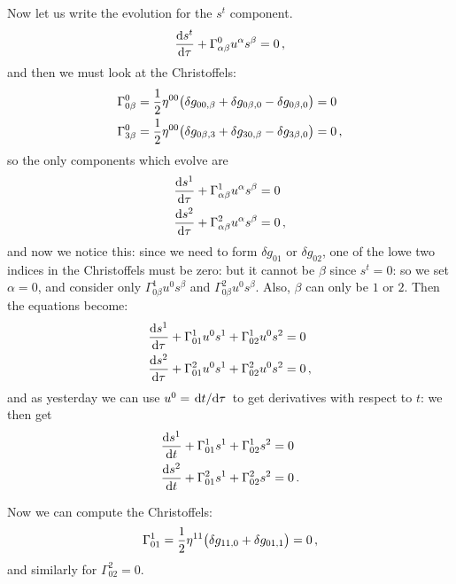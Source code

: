 \documentclass[main.tex]{subfiles}
\begin{document}
Now let us write the evolution for the \(s^{t}\) component. 
%
\begin{align}
  \dv{s^{t}}{\tau } + \Gamma^{0}_{\alpha \beta } u^{\alpha } s^{\beta } = 0
\,,
\end{align}
%
and then we must look at the Christoffels: 
%
\begin{align}
\Gamma^{0}_{0 \beta } &= \frac{1}{2} \eta^{00} \qty(
    \delta g_{0 0, \beta } +
    \delta g_{0 \beta , 0} 
    - \delta g_{0 \beta ,0 } 
) =0 \\
\Gamma^{0}_{3 \beta } &= \frac{1}{2} \eta^{00} \qty(
    \delta g_{0 \beta , 3 } +
    \delta g_{3 0 , \beta } 
    - \delta g_{3 \beta ,0 } 
) =0
\,,
\end{align}
%
so the only components which evolve are 
%
\begin{align}
  \dv{s^{1}}{\tau } + \Gamma^{1}_{\alpha \beta } u^{\alpha } s^{\beta } &= 0 \\
  \dv{s^{2}}{\tau } + \Gamma^{2}_{\alpha \beta } u^{\alpha } s^{\beta } &= 0
\,,
\end{align}
%
and now we notice this: since we need to form \(\delta g_{01}\) or \(\delta g_{02}\), one of the lowe two indices in the Christoffels must be zero: but it cannot be \(\beta \) since \(s^{t}=0\): so we set \(\alpha =0\), and consider only \(\Gamma^{1}_{0 \beta } u^{0} s^{\beta }\) and \(\Gamma^{2}_{0 \beta } u^{0} s^{\beta }\). Also, \(\beta \) can only be \(1\) or \(2\). Then the equations become: 
%
\begin{subequations}
\begin{align}
    \dv{s^{1}}{\tau } + \Gamma^{1}_{0 1 } u^{0 } s^{1 } + \Gamma^{1}_{0 2 } u^{0 } s^{2 } &= 0 \\
  \dv{s^{2}}{\tau } + \Gamma^{2}_{0 1} u^{0 } s^{1}  + \Gamma^{2}_{0 2} u^{0 } s^{2} &= 0
\,,
\end{align}
\end{subequations}
%
and as yesterday we can use \(u^{0} = \dv*{t}{\tau }\) to get derivatives with respect to \(t\): we then get 
%
\begin{subequations}
    \begin{align}
        \dv{s^{1}}{t } + \Gamma^{1}_{0 1 }  s^{1 } + \Gamma^{1}_{0 2 }  s^{2 } &= 0 \\
      \dv{s^{2}}{t } + \Gamma^{2}_{0 1}  s^{1}  + \Gamma^{2}_{0 2}  s^{2} &= 0
    \,.
    \end{align}
\end{subequations}

Now we can compute the Christoffels: 
%
\begin{align}
  \Gamma^{1}_{01} = \frac{1}{2} \eta^{11} \qty(
      \delta g_{11, 0} + \delta g_{01, 1}
  ) = 0
\,,
\end{align}
%
and similarly for \(\Gamma^{2}_{02}=0\). 
\end{document}
